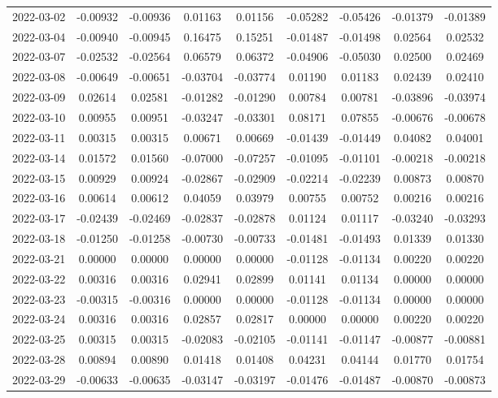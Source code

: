 \begin{footnotesize}
\begin{longtable}{lcccccccc}
2022-03-02 & -0.00932 & -0.00936 & 0.01163 & 0.01156 & -0.05282 & -0.05426 & -0.01379 & -0.01389 \\
2022-03-04 & -0.00940 & -0.00945 & 0.16475 & 0.15251 & -0.01487 & -0.01498 & 0.02564 & 0.02532 \\
2022-03-07 & -0.02532 & -0.02564 & 0.06579 & 0.06372 & -0.04906 & -0.05030 & 0.02500 & 0.02469 \\
2022-03-08 & -0.00649 & -0.00651 & -0.03704 & -0.03774 & 0.01190 & 0.01183 & 0.02439 & 0.02410 \\
2022-03-09 & 0.02614 & 0.02581 & -0.01282 & -0.01290 & 0.00784 & 0.00781 & -0.03896 & -0.03974 \\
2022-03-10 & 0.00955 & 0.00951 & -0.03247 & -0.03301 & 0.08171 & 0.07855 & -0.00676 & -0.00678 \\
2022-03-11 & 0.00315 & 0.00315 & 0.00671 & 0.00669 & -0.01439 & -0.01449 & 0.04082 & 0.04001 \\
2022-03-14 & 0.01572 & 0.01560 & -0.07000 & -0.07257 & -0.01095 & -0.01101 & -0.00218 & -0.00218 \\
2022-03-15 & 0.00929 & 0.00924 & -0.02867 & -0.02909 & -0.02214 & -0.02239 & 0.00873 & 0.00870 \\
2022-03-16 & 0.00614 & 0.00612 & 0.04059 & 0.03979 & 0.00755 & 0.00752 & 0.00216 & 0.00216 \\
2022-03-17 & -0.02439 & -0.02469 & -0.02837 & -0.02878 & 0.01124 & 0.01117 & -0.03240 & -0.03293 \\
2022-03-18 & -0.01250 & -0.01258 & -0.00730 & -0.00733 & -0.01481 & -0.01493 & 0.01339 & 0.01330 \\
2022-03-21 & 0.00000 & 0.00000 & 0.00000 & 0.00000 & -0.01128 & -0.01134 & 0.00220 & 0.00220 \\
2022-03-22 & 0.00316 & 0.00316 & 0.02941 & 0.02899 & 0.01141 & 0.01134 & 0.00000 & 0.00000 \\
2022-03-23 & -0.00315 & -0.00316 & 0.00000 & 0.00000 & -0.01128 & -0.01134 & 0.00000 & 0.00000 \\
2022-03-24 & 0.00316 & 0.00316 & 0.02857 & 0.02817 & 0.00000 & 0.00000 & 0.00220 & 0.00220 \\
2022-03-25 & 0.00315 & 0.00315 & -0.02083 & -0.02105 & -0.01141 & -0.01147 & -0.00877 & -0.00881 \\
2022-03-28 & 0.00894 & 0.00890 & 0.01418 & 0.01408 & 0.04231 & 0.04144 & 0.01770 & 0.01754 \\
2022-03-29 & -0.00633 & -0.00635 & -0.03147 & -0.03197 & -0.01476 & -0.01487 & -0.00870 & -0.00873 \\

\end{longtable}
\end{footnotesize}
